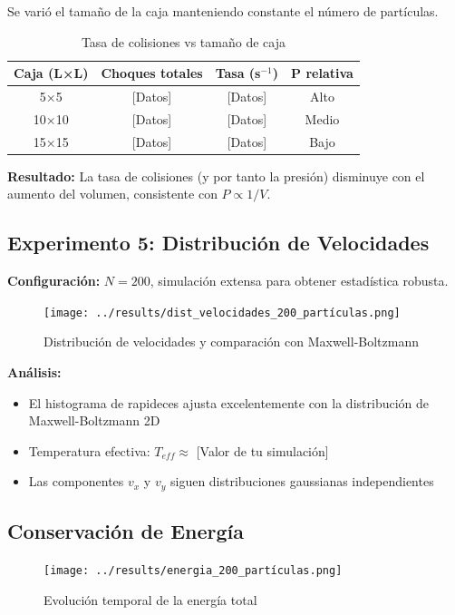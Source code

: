 \documentclass[12pt,a4paper]{article}
\begin{document}
Se varió el tamaño de la caja manteniendo constante el número de partículas.

\begin{table}[H]
\centering
\caption{Tasa de colisiones vs tamaño de caja}
\begin{tabular}{|c|c|c|c|}
\hline
\textbf{Caja (L×L)} & \textbf{Choques totales} & \textbf{Tasa (s$^{-1}$)} & \textbf{P relativa} \\
\hline
5×5 & [Datos] & [Datos] & Alto \\
10×10 & [Datos] & [Datos] & Medio \\
15×15 & [Datos] & [Datos] & Bajo \\
\hline
\end{tabular}
\end{table}

\textbf{Resultado:} La tasa de colisiones (y por tanto la presión) disminuye con el aumento del volumen, consistente con $P \propto 1/V$.

\subsection{Experimento 5: Distribución de Velocidades}

\textbf{Configuración:} $N=200$, simulación extensa para obtener estadística robusta.

\begin{figure}[H]
\centering
\texttt{[image: ../results/dist\_velocidades\_200\_partículas.png]}
\caption{Distribución de velocidades y comparación con Maxwell-Boltzmann}
\end{figure}

\textbf{Análisis:}
\begin{itemize}
    \item El histograma de rapideces ajusta excelentemente con la distribución de Maxwell-Boltzmann 2D
    \item Temperatura efectiva: $T_{eff} \approx $ [Valor de tu simulación]
    \item Las componentes $v_x$ y $v_y$ siguen distribuciones gaussianas independientes
\end{itemize}

\subsection{Conservación de Energía}

\begin{figure}[H]
\centering
\texttt{[image: ../results/energia\_200\_partículas.png]}
\caption{Evolución temporal de la energía total}
\end{figure}
\end{document}
